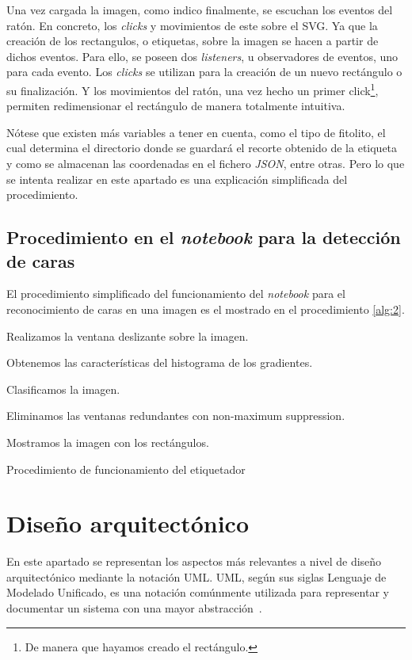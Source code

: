 Una vez cargada la imagen, como indico finalmente, se escuchan los eventos del ratón. En concreto, los \textit{clicks} y movimientos de este sobre el SVG. Ya que la creación de los rectangulos, o etiquetas, sobre la imagen se hacen a partir de dichos eventos. Para ello, se poseen dos \textit{listeners}, u observadores de eventos, uno para cada evento. Los \textit{clicks} se utilizan para la creación de un nuevo rectángulo o su finalización. Y los movimientos del ratón, una vez hecho un primer click\footnote{De manera que hayamos creado el rectángulo.}, permiten redimensionar el rectángulo de manera totalmente intuitiva.

Nótese que existen más variables a tener en cuenta, como el tipo de fitolito, el cual determina el directorio donde se guardará el recorte obtenido de la etiqueta y como se almacenan las coordenadas en el fichero \textit{JSON}, entre otras. Pero lo que se intenta realizar en este apartado es una explicación simplificada del procedimiento.

\subsection{Procedimiento en el \textit{notebook} para la detección de caras}

El procedimiento simplificado del funcionamiento del \textit{notebook} para el reconocimiento de caras en una imagen es el mostrado en el procedimiento \ref{alg:2}.

\begin{algorithm}
    Realizamos la ventana deslizante sobre la imagen.    
    
    Obtenemos las características del histograma de los gradientes.

	Clasificamos la imagen.    
    
    Eliminamos las ventanas redundantes con non-maximum suppression.

    Mostramos la imagen con los rectángulos.
    \caption{Procedimiento de funcionamiento del etiquetador}
    \label{alg:2}
\end{algorithm}

\section{Diseño arquitectónico}

En este apartado se representan los aspectos más relevantes a nivel de diseño arquitectónico mediante la notación UML. UML, según sus siglas Lenguaje de Modelado Unificado, es una notación comúnmente utilizada para representar y documentar un sistema con una mayor abstracción~\cite{wiki:uml}.

